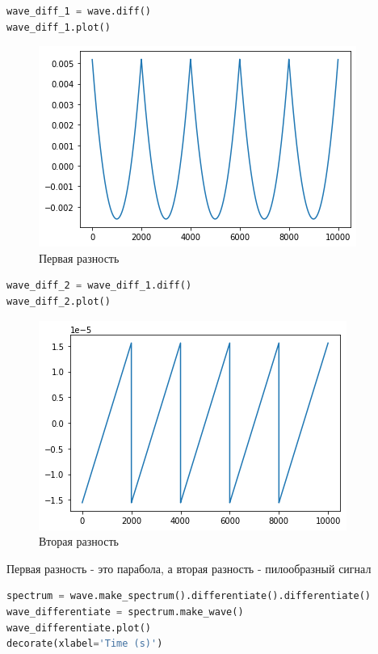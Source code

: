 \begin{lstlisting}[language=Python]
wave_diff_1 = wave.diff()
wave_diff_1.plot()
\end{lstlisting}

\begin{figure}[H]
	\begin{center}
		\includegraphics[scale=1]{fig/lab09/lab09_11.png}
		\caption{Первая разность}
	\end{center}
\end{figure}

\begin{lstlisting}[language=Python]
wave_diff_2 = wave_diff_1.diff()
wave_diff_2.plot()
\end{lstlisting}

\begin{figure}[H]
	\begin{center}
		\includegraphics[scale=1]{fig/lab09/lab09_12.png}
		\caption{Вторая разность}
	\end{center}
\end{figure}

Первая разность - это парабола, а вторая разность - пилообразный сигнал

\begin{lstlisting}[language=Python]
spectrum = wave.make_spectrum().differentiate().differentiate()
wave_differentiate = spectrum.make_wave()
wave_differentiate.plot()
decorate(xlabel='Time (s)')
\end{lstlisting}


